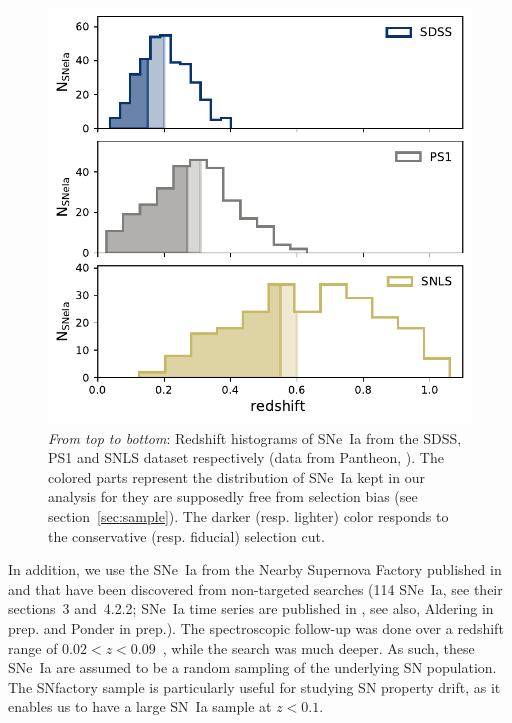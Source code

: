 \documentclass[]{aa} %
\newcommand{\mr}[1]{{\textcolor[rgb]{0.60,0.10,0.6}{#1}}}
\begin{document}
\begin{figure}
    \centering
    \includegraphics[width=0.95\linewidth]{Article_figures/hist_surveys_cuts_55-cividis.pdf}
    \caption{\textit{From top to bottom}: Redshift histograms of SNe~Ia from
        the SDSS, PS1 and SNLS dataset respectively (data from Pantheon,
        \citealt{scolnic2018a}).  The colored parts represent the distribution
        of SNe~Ia kept in our analysis for they are supposedly free from
        selection bias (see section~\ref{sec:sample}). The darker (resp. lighter)
    color responds to the conservative (resp. fiducial) selection cut.}
    \label{fig:cuts}
\end{figure}

In addition, we use the SNe~Ia from the Nearby Supernova Factory
\citep[SNfactory,][]{aldering2002} published in \cite{rigault2018} and that have
been discovered from non-targeted searches (114 SNe~Ia, see their sections~3
and~4.2.2; \mr{SNe~Ia time series are published in \citealt{Saunders2020}, see also, Aldering in prep. and Ponder in prep.)}. The
spectroscopic follow-up was done over a redshift range of $0.02 < z <
0.09$~\citep[as in][]{rigault2018}, while the search was much deeper. As such,
these SNe~Ia are assumed to be a random sampling of the underlying SN
population. The SNfactory sample is particularly useful for studying SN property
drift, as it enables us to have a large SN~Ia sample at $z<0.1$.  
\end{document}

